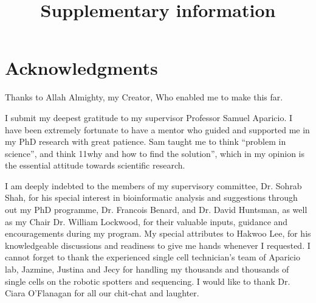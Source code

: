 

\makeatletter
\newcommand{\putFigLargCap}[5]
{
\begin{center}
\texttt{[image: \#1]}   
\bigskip
\setbox0\vbox{
\let\caption@rule\relax
\captionof{figure}[#5]{\textbf{#5} #3 \label{#4}}
\global\skip1\lastskip\unskip
\global\setbox1\lastbox

}
\unvbox0
\setbox0\hbox{\unhbox1\unskip\unskip\unpenalty
\global\setbox1\lastbox}
\unvbox1
\vskip\skip1
\end{center}
}
\makeatother





\title{Supplementary information}















\chapter{Acknowledgments}

Thanks to Allah Almighty, my Creator, Who enabled me to make this far.

I submit my deepest gratitude to my supervisor Professor Samuel Aparicio. I have been extremely fortunate to have a mentor who guided and supported me in my PhD research with great patience. Sam taught me to think ``problem in science'', and think 11why and how to find the solution'', which in my opinion is the essential attitude towards scientific research. 

I am deeply indebted to the members of my supervisory committee, Dr. Sohrab Shah, for his special interest in bioinformatic analysis and suggestions through out my PhD programme, Dr. Francois Benard, and Dr. David Huntsman, as well as my Chair Dr. William Lockwood, for their valuable inputs, guidance and encouragements during my program. My special attributes to Hakwoo Lee, for his knowledgeable discussions and  readiness to give me hands whenever I requested. I cannot forget to thank the experienced single cell technician's team of Aparicio lab, Jazmine, Justina and Jecy for handling my thousands and thousands of single cells on the robotic spotters and sequencing. I would like to thank Dr. Ciara O'Flanagan for all our chit-chat and laughter. 

